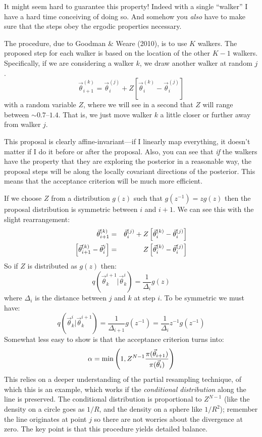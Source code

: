 It might seem hard to guarantee this property! Indeed with a single
``walker'' I have a hard time conceiving of doing so. And somehow you
{\it also} have to make sure that the steps obey the ergodic
properties necessary.

The procedure, due to Goodman \& Weare (2010), is to use $K$
walkers. The proposed step for each walker is based on the location of
the other $K-1$ walkers. Specifically, if we are considering a walker
$k$, we draw another walker at random $j$.
\begin{equation}
 \vec{\theta}_{i+1}^{(k)} = \vec{\theta}_{i}^{(j)} +
 Z \left[\vec{\theta}_{i}^{(k)} - \vec{\theta}_{i}^{(j)}\right]
\end{equation}
with a random variable $Z$, where we will see in a second that $Z$
will range between $\sim 0.7$--$1.4$. That is, we just move walker $k$
a little closer or further away from walker $j$.

This proposal is clearly affine-invariant---if I linearly map
everything, it doesn't matter if I do it before or after the
proposal. Also, you can see that {\it if} the walkers have the
property that they are exploring the posterior in a reasonable way,
the proposal steps will be along the locally covariant directions of
the posterior. This means that the acceptance criterion will be much
more efficient.

If we choose $Z$ from a distribution $g(z)$ such that $g(z^{-1}) =
zg(z)$ then the proposal distribution is symmetric between $i$ and
$i+1$. We can see this with the slight rearrangement:
\begin{eqnarray}
 \vec{\theta}_{i+1}^{(k)} &=& \vec{\theta}_{i}^{(j)} +
 Z \left[\vec{\theta}_{i}^{(k)} - \vec{\theta}_{i}^{(j)}\right] \cr
 \left[\vec{\theta}_{i+1}^{(k)}
 - \vec{\theta}_i^{j}\right] &=& Z \left[\vec{\theta}_{i}^{(k)} - \vec{\theta}_{i}^{(j)}\right] 
\end{eqnarray}
So if $Z$ is distributed as $g(z)$ then:
\begin{equation}
 q(\vec{\theta}_k^{i+1}| \vec{\theta}_k^{i}) = \frac{1}{\Delta_i}
 g(z)
\end{equation}
where $\Delta_i$ is the distance between $j$ and $k$ at step $i$. To
be symmetric we must have:
\begin{equation}
 q(\vec{\theta}_k^{i}| \vec{\theta}_k^{i+1}) = \frac{1}{\Delta_{i+1}}
 g(z^{-1}) = \frac{1}{\Delta_i} z^{-1} g(z^{-1})
\end{equation}
Somewhat less easy to show is that the acceptance criterion turns
into:
\begin{equation}
\alpha = {\rm min}\left(1,
Z^{N-1} \frac{\pi(\vec{\theta}_{i+1})}{\pi(\vec{\theta}_i)} \right)
\end{equation}
This relies on a deeper understanding of the partial resampling
technique, of which this is an example, which works if the {\it
conditional distribution} along the line is preserved. The conditional
distribution is proportional to $Z^{N-1}$ (like the density on a
circle goes as $1/R$, and the density on a sphere like $1/R^2$);
remember the line originates at point $j$ so there are not worries
about the divergence at zero.
The key point is that this procedure yields detailed balance.

